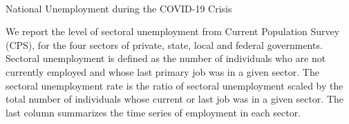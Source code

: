 \begin{landscape}

\begin{table}[!ht]
\begin{center}
\begin{threeparttable}

\caption{\\ National Unemployment during the COVID-19 Crisis}
\label{table:unemp:national1}

\centering 

\begin{small}

  

\end{small}

\begin{footnotesize}
\begin{tablenotes}
\item  We report the level of sectoral unemployment from Current Population Survey (CPS), for the four sectors of private, state, local and federal governments. Sectoral unemployment is defined as the number of individuals who are not currently employed and whose last primary job was in a given sector. The sectoral unemployment rate is the ratio of sectoral unemployment scaled by the total number of individuals whose current or last job was in a given sector. The last column summarizes the time series of employment in each sector.
\end{tablenotes}
\end{footnotesize}
\end{threeparttable}
\end{center}
\end{table}

\thispagestyle{empty}

\end{landscape}



